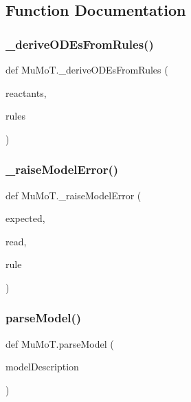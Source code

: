 \subsection{Function Documentation}
\mbox{\label{namespace_mu_mo_t_a276566fb102dd4e4bf32a9ba4fb8a09b}} 
\subsubsection{\texorpdfstring{\+\_\+derive\+O\+D\+Es\+From\+Rules()}{\_deriveODEsFromRules()}}
{\footnotesize\ttfamily def Mu\+Mo\+T.\+\_\+derive\+O\+D\+Es\+From\+Rules (\begin{DoxyParamCaption}\item[{}]{reactants,  }\item[{}]{rules }\end{DoxyParamCaption})\hspace{0.3cm}{\ttfamily [private]}}

\mbox{\label{namespace_mu_mo_t_a07dd350ff74bc1abafd7f44f972089a2}} 
\subsubsection{\texorpdfstring{\+\_\+raise\+Model\+Error()}{\_raiseModelError()}}
{\footnotesize\ttfamily def Mu\+Mo\+T.\+\_\+raise\+Model\+Error (\begin{DoxyParamCaption}\item[{}]{expected,  }\item[{}]{read,  }\item[{}]{rule }\end{DoxyParamCaption})\hspace{0.3cm}{\ttfamily [private]}}

\mbox{\label{namespace_mu_mo_t_a563aad4a460dbcc0705cf99bb6f6dd5d}} 
\subsubsection{\texorpdfstring{parse\+Model()}{parseModel()}}
{\footnotesize\ttfamily def Mu\+Mo\+T.\+parse\+Model (\begin{DoxyParamCaption}\item[{}]{model\+Description }\end{DoxyParamCaption})}



